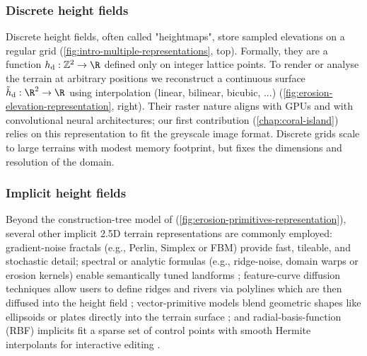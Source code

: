 \subsubsection{Discrete height fields}
Discrete height fields, often called "heightmaps", store sampled elevations on a regular grid (\cref{fig:intro-multiple-representations}, top). Formally, they are a function $h_{ \text{d}} : \mathbb{Z}^{2} \to \R$ defined only on integer lattice points. To render or analyse the terrain at arbitrary positions we reconstruct a continuous surface $ \tilde{h}_{ \text{d}} : \R^{2} \to \R$ using interpolation (linear, bilinear, bicubic, ...) (\cref{fig:erosion-elevation-representation}, right). Their raster nature aligns with GPUs and with convolutional neural architectures; our first contribution (\cref{chap:coral-island}) relies on this representation to fit the greyscale image format. Discrete grids scale to large terrains with modest memory footprint, but fixes the dimensions and resolution of the domain.

\subsubsection{Implicit height fields}

Beyond the construction-tree model of \cite{Genevaux2015} (\cref{fig:erosion-primitives-representation}), several other implicit 2.5D terrain representations are commonly employed: gradient-noise fractals (e.g., Perlin, Simplex or FBM) provide fast, tileable, and stochastic detail; spectral or analytic formulas (e.g., ridge-noise, domain warps or erosion kernels) enable semantically tuned landforms ; feature-curve diffusion techniques allow users to define ridges and rivers via polylines which are then diffused into the height field ; vector-primitive models blend geometric shapes like ellipsoids or plates directly into the terrain surface ; and radial-basis-function (RBF) implicits fit a sparse set of control points with smooth Hermite interpolants for interactive editing .

